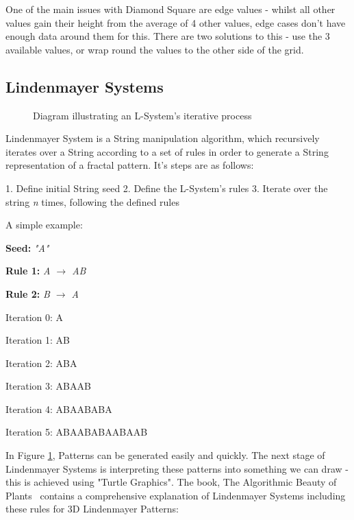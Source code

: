 \documentclass[a4paper,10pt]{report}
\begin{document}
One of the main issues with Diamond Square are edge values - whilst all other values gain their height from the average of 4 other values, edge cases don't have enough data around them for this. There are two solutions to this - use the 3 available values, or wrap round the values to the other side of the grid. 

\subsection{Lindenmayer Systems}


\begin{figure}
\centering
 \caption{Diagram illustrating an L-System's iterative process}
 \label{fig:l_system_AB}
\end{figure}


Lindenmayer System is a String manipulation algorithm, which recursively iterates over a String according to a set of rules in order to generate a String representation of a fractal pattern. It's steps are as follows:


1. Define initial String seed
2. Define the L-System's rules
3. Iterate over the string \textit{n} times, following the defined rules


A simple example:\medskip

\textbf{Seed:} \textit{"A"}

\textbf{Rule 1:} \textit{A $\rightarrow$ AB}

\textbf{Rule 2:} \textit{B $\rightarrow$ A}


Iteration 0: A

Iteration 1: AB

Iteration 2: ABA

Iteration 3: ABAAB

Iteration 4: ABAABABA

Iteration 5: ABAABABAABAAB\medskip



In Figure \ref{fig:l_system_AB}, Patterns can be generated easily and quickly. The next stage of Lindenmayer Systems is interpreting these patterns into something we can draw - this is achieved using "Turtle Graphics". The book, The Algorithmic Beauty of Plants~\cite{prusinkiewicz2012algorithmic} contains a comprehensive explanation of Lindenmayer Systems including these rules for 3D Lindenmayer Patterns:\medskip
\end{document}
